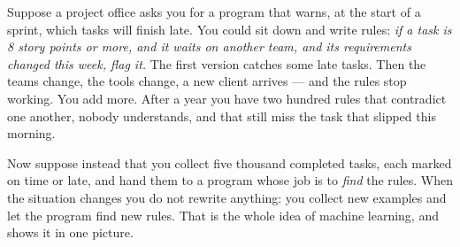 Suppose a project office asks you for a program that warns, at the start of a
sprint, which tasks will finish late. You could sit down and write rules:
\emph{if a task is 8 story points or more, and it waits on another team, and its
requirements changed this week, flag it.} The first version catches some late
tasks. Then the teams change, the tools change, a new client arrives --- and the
rules stop working. You add more. After a year you have two hundred rules that
contradict one another, nobody understands, and that still miss the task that
slipped this morning.

Now suppose instead that you collect five thousand completed tasks, each marked
on time or late, and hand them to a program whose job is to \emph{find} the
rules. When the situation changes you do not rewrite anything: you collect new
examples and let the program find new rules. That is the whole idea of machine
learning, and  shows it in one picture.


